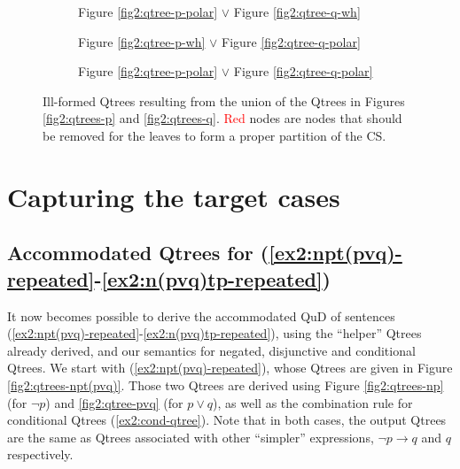  
\begin{figure}[H]
	\centering
	\begin{subfigure}[b]{.3\linewidth}
		\centering
		\caption{Figure \ref{fig2:qtree-p-polar} $\vee$ Figure \ref{fig2:qtree-q-wh}}
	\end{subfigure}\hfill
	\begin{subfigure}[b]{.3\linewidth}
		\centering
		\caption{Figure \ref{fig2:qtree-p-wh} $\vee$ Figure \ref{fig2:qtree-q-polar} }
	\end{subfigure}\hfill
	\begin{subfigure}[b]{.3\linewidth}
		\centering
		\caption{Figure \ref{fig2:qtree-p-polar} $\vee$ Figure \ref{fig2:qtree-q-polar}}
	\end{subfigure}
	\caption{Ill-formed Qtrees resulting from the union of the Qtrees in Figures \ref{fig2:qtrees-p} and \ref{fig2:qtrees-q}. \textcolor{red}{Red} nodes are nodes that should be removed for the leaves to form a proper partition of the CS.}
	\label{fig2:qtree-pvq-ill-formed}
\end{figure}

\section{Capturing the target cases}


\subsection{Accommodated Qtrees for (\ref{ex2:npt(pvq)-repeated}-\ref{ex2:n(pvq)tp-repeated})}
It now becomes possible to derive the accommodated QuD of sentences (\ref{ex2:npt(pvq)-repeated}-\ref{ex2:n(pvq)tp-repeated}), using the ``helper'' Qtrees already derived, and our semantics for negated, disjunctive and conditional Qtrees. We start with (\ref{ex2:npt(pvq)-repeated}), whose Qtrees are given in Figure \ref{fig2:qtrees-npt(pvq)}. Those two Qtrees are derived using Figure \ref{fig2:qtrees-np} (for $\neg p$) and \ref{fig2:qtree-pvq} (for $p\vee q$), as well as the combination rule for conditional Qtrees (\ref{ex2:cond-qtree}). Note that in both cases, the output Qtrees are the same as Qtrees associated with other ``simpler'' expressions, $\neg p \rightarrow q$ and $q$ respectively.

